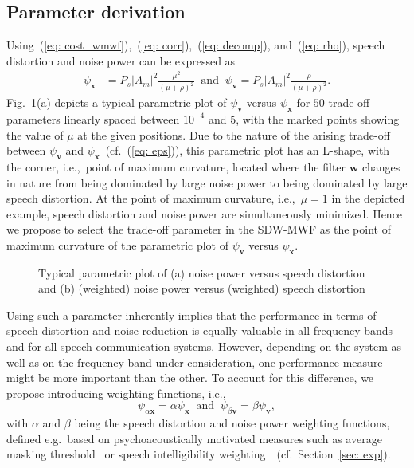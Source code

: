 \documentclass[10pt]{IEEEtran}
\begin{document}
\subsection{Parameter derivation}
Using~(\ref{eq: cost_wmwf}),~(\ref{eq: corr}),~(\ref{eq: decomp}), and~(\ref{eq: rho}), speech distortion and noise power can be expressed as
\begin{align}
  \label{eq: eps}
  \psi_{\mathbf{x}} & = P_s |A_m|^2 \frac{\mu^2}{(\mu+\rho)^2} \; \; \text{and} \; \; \psi_{\mathbf{v}} = P_s |A_m|^2 \frac{\rho}{(\mu+\rho)^2}.
\end{align}
Fig.~\ref{fig: lcurve}(a) depicts a typical parametric plot of $\psi_{\mathbf{v}}$ versus $\psi_{\mathbf{x}}$ for $50$ trade-off parameters linearly spaced between $10^{-4}$ and $5$, with the marked points showing the value of $\mu$ at the given positions.
Due to the nature of the arising trade-off between $\psi_{\mathbf{v}}$ and $\psi_{\mathbf{x}}$~(cf.~(\ref{eq: eps})), this parametric plot has an L-shape, with the corner, i.e.,~point of maximum curvature, located where the filter $\mathbf{w}$ changes in nature from being dominated by large noise power to being dominated by large speech distortion.
At the point of maximum curvature, i.e.,~$\mu = 1$ in the depicted example, speech distortion and noise power are simultaneously minimized.
Hence we propose to select the trade-off parameter in the SDW-MWF as the point of maximum curvature of the parametric plot of $\psi_{\mathbf{v}}$ versus $\psi_{\mathbf{x}}$. \newline 
\begin{figure}[t!]
  \centering
   
  \caption{Typical parametric plot of (a) noise power versus speech distortion and (b) (weighted) noise power versus (weighted) speech distortion}
  \label{fig: lcurve}
\end{figure}
Using such a parameter inherently implies that the performance in terms of speech distortion and noise reduction is equally valuable in all frequency bands and for all speech communication systems.
However, depending on the system as well as on the frequency band under consideration, one performance measure might be more important than the other. 
To account for this difference, we propose introducing weighting functions, i.e.,
\begin{equation}
  \psi_{\alpha \mathbf{x}} = \alpha \psi_{\mathbf{x}}  \; \; \text{and} \; \; \psi_{\beta \mathbf{v}} = \beta \psi_{\mathbf{v}},
\end{equation}
with $\alpha$ and $\beta$ being the speech distortion and noise power weighting functions, defined e.g.~based on psychoacoustically motivated measures such as average masking threshold~\cite{Painter_IEEE_2000} or speech intelligibility weighting~\cite{ASA}~(cf.~Section~\ref{sec: exp}).
\end{document}
